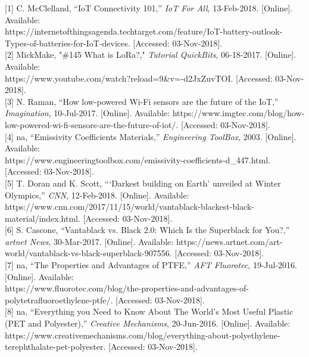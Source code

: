 \documentclass[10pt,draftclsnofoot,onecolumn,letterpaper]{article}
\begin{document}
    {\fontsize{12pt}{12.0pt}
    [1] C. McClelland, “IoT Connectivity 101,” \textit{IoT For All}, 13-Feb-2018. [Online]. Available:\\
    https://internetofthingsagenda.techtarget.com/feature/IoT-battery-outlook-Types-of-batteries-for-IoT-devices. [Accessed: 03-Nov-2018].\\
    
    [2] MickMake, "\#145 What is LoRa?," \textit{Tutorial QuickBits}, 06-18-2017. [Online]. Available:\\ https://www.youtube.com/watch?reload=9\&v=-d2JxZuvTOI. [Accessed: 03-Nov-2018].\\
    
    [3] N. Raman, “How low-powered Wi-Fi sensors are the future of the IoT,” \textit{Imagination}, 10-Jul-2017. [Online]. Available: https://www.imgtec.com/blog/how-low-powered-wi-fi-sensors-are-the-future-of-iot/. [Accessed: 03-Nov-2018].\\
    
    [4] na, “Emissivity Coefficients Materials,” \textit{Engineering ToolBox}, 2003. [Online]. Available:\\ https://www.engineeringtoolbox.com/emissivity-coefficients-d\_447.html. [Accessed: 03-Nov-2018].\\
    
    [5] T. Doran and K. Scott, “‘Darkest building on Earth’ unveiled at Winter Olympics,” \textit{CNN}, 12-Feb-2018. [Online]. Available: https://www.cnn.com/2017/11/15/world/vantablack-blackest-black-material/index.html. [Accessed: 03-Nov-2018].\\
    
    [6] S. Cascone, “Vantablack vs. Black 2.0: Which Is the Superblack for You?,” \textit{artnet News}, 30-Mar-2017. [Online]. Available: https://news.artnet.com/art-world/vantablack-vs-black-superblack-907556. [Accessed: 03-Nov-2018].\\
    
    [7] na, “The Properties and Advantages of PTFE,” \textit{AFT Fluorotec}, 19-Jul-2016. [Online]. Available:\\ https://www.fluorotec.com/blog/the-properties-and-advantages-of-polytetrafluoroethylene-ptfe/. [Accessed: 03-Nov-2018].\\
    
    [8] na, “Everything you Need to Know About The World’s Most Useful Plastic (PET and Polyester),” \textit{Creative Mechanisms}, 20-Jun-2016. [Online]. Available: https://www.creativemechanisms.com/blog/everything-about-polyethylene-terephthalate-pet-polyester. [Accessed: 03-Nov-2018].\\
    
}
\end{document}
